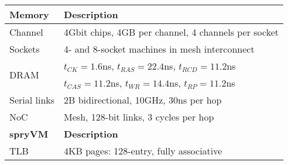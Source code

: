 \begin{table}
\begin{center}
{\begin{tabular}{ l  l }
				\toprule
				{\bf Memory}                  & {\bf Description}  \\
				\toprule
				
				
				\multirow{1}{*}{Channel}                                   &  4Gbit chips, 4GB per channel, 4 channels per socket \\         
				\cmidrule{2-2}
				\multirow{1}{*}{Sockets}                             &  4- and 8-socket machines in mesh interconnect\\       
				\cmidrule{2-2}
				\multirow{2}{*}{DRAM}                                &  $t_{CK} = 1.6$ns, $t_{RAS} = 22.4$ns, $t_{RCD} = 11.2$ns \\
				&  $t_{CAS} = 11.2$ns, $t_{WR} = 14.4$ns, $t_{RP} = 11.2$ns \\ 
				\cmidrule{2-2}
				\multirow{1}{*}{Serial links}                             &  2B bidirectional, 10GHz, 30ns per hop~\cite{kanter:cavium, towles:unifying} \\           
				\cmidrule{2-2}
				\multirow{1}{*}{NoC}                             &  Mesh, 128-bit links, 3 cycles per hop \\
				
				\toprule
				{\bf spryVM}                  & {\bf Description}  \\
				\toprule
				\multirow{1}{*}{TLB}	& $4$KB pages: 128-entry, fully associative \\
				
				
				\bottomrule
			\end{tabular}
		} %
	\end{center}
	\vspace{-0.1in}
\end{table}
